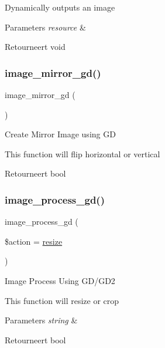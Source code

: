 Dynamically outputs an image


\begin{DoxyParams}{Parameters}
{\em resource} & \\
\hline
\end{DoxyParams}
\begin{DoxyReturn}{Retourneert}
void 
\end{DoxyReturn}
\mbox{\label{class_c_i___image__lib_a3f6d47ec077726da699890d4644797ad}} 
\subsubsection{\texorpdfstring{image\_mirror\_gd()}{image\_mirror\_gd()}}
{\footnotesize\ttfamily image\+\_\+mirror\+\_\+gd (\begin{DoxyParamCaption}{ }\end{DoxyParamCaption})}

Create Mirror Image using GD

This function will flip horizontal or vertical

\begin{DoxyReturn}{Retourneert}
bool 
\end{DoxyReturn}
\mbox{\label{class_c_i___image__lib_aa8ef6ef7b931a663dd906ce27236c6fd}} 
\subsubsection{\texorpdfstring{image\_process\_gd()}{image\_process\_gd()}}
{\footnotesize\ttfamily image\+\_\+process\+\_\+gd (\begin{DoxyParamCaption}\item[{}]{\$action = {\ttfamily \textquotesingle{}\mbox{\hyperlink{class_c_i___image__lib_a94e38a7d478ce07200a52c51497e598e}{resize}}\textquotesingle{}} }\end{DoxyParamCaption})}

Image Process Using G\+D/\+G\+D2

This function will resize or crop


\begin{DoxyParams}{Parameters}
{\em string} & \\
\hline
\end{DoxyParams}
\begin{DoxyReturn}{Retourneert}
bool 
\end{DoxyReturn}
\mbox{\label{class_c_i___image__lib_a141ec7c2c7cbe7a9a6a913d12fe973da}} 
